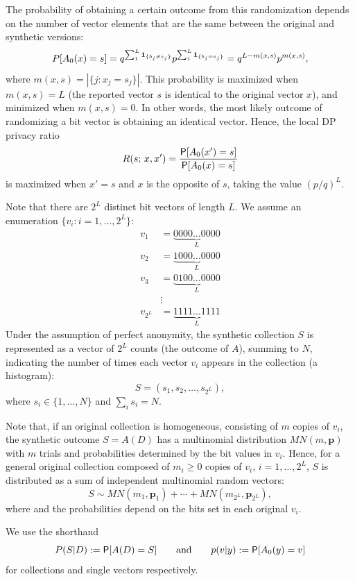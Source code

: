 \documentclass[11pt]{article}
\begin{document}
The probability of obtaining a certain outcome from this randomization depends on the number of vector elements that are the same between the original and synthetic versions:
\[ P[A_0(x) = s] = q^{\sum_{1}^L\ind{b_j \neq s_j}}p^{\sum_{1}^L\ind{b_j = s_j}} 
    = q^{L-m(x,s)}p^{m(x,s)}, \]
where $m(x,s) = |\{j: x_j = s_j\}|$. 
This probability is maximized when $m(x,s) = L$ (the reported vector
$s$ is identical to the original vector $x$), and minimized when $m(x,s) = 0$.
In other words, the most likely outcome of randomizing a bit vector is obtaining
an identical vector.
Hence, the local DP privacy ratio 
\[ R(s;\,x,x') = \frac{\P[A_0(x') = s]}{\P[A_0(x) = s]} \]
is maximized when $x'=s$ and $x$ is the opposite of $s$, taking the value $(p/q)^L$.


Note that there are $2^L$ distinct bit vectors of length $L$.
We assume an enumeration $\{v_i : i = 1,\dots,2^L\}$:
\begin{align*}
v_1 &= \underset{L}{\underbrace{0000 \dots 0000}} \\
v_2 &= \underset{L}{\underbrace{1000 \dots 0000}} \\
v_3 &= \underset{L}{\underbrace{0100 \dots 0000}} \\
 &  \vdots \\
v_{2^L} &=  \underset{L}{\underbrace{1111 \dots 1111}} 
\end{align*}
Under the assumption of perfect anonymity, the synthetic collection $S$ is represented as a vector of $2^L$ counts (the outcome of $A$), summing to $N$, indicating the number of times each vector $v_i$ appears in the collection (\ie a histogram):
\[ S = (s_1,s_2,\dots,s_{2^L}), \]
where $s_i \in \{1, \dots, N\}$ and $\sum_i s_i = N$.

Note that, if an original collection is homogeneous, consisting of $m$ copies of $v_i$, the synthetic outcome $S = A(D)$ has a multinomial distribution $MN(m,\boldsymbol{p})$ with $m$ trials and probabilities determined by the bit values in $v_i$.
Hence, for a general original collection composed of $m_i \geq 0$ copies of $v_i$, $i = 1,\dots,2^L$, $S$ is distributed as a sum of independent multinomial random vectors:
\[ S \sim MN(m_1, \boldsymbol{p}_1) + \cdots + MN(m_{2^L}, \boldsymbol{p}_{2^L}), \]
where and the probabilities depend on the bits set in each original $v_i$.

We use the shorthand
\[ P(S | D) := \P[A(D) = S] \qquad\text{and}\qquad p(v | y) := \P[A_0(y) = v] \]
for collections and single vectors respectively.
\end{document}
